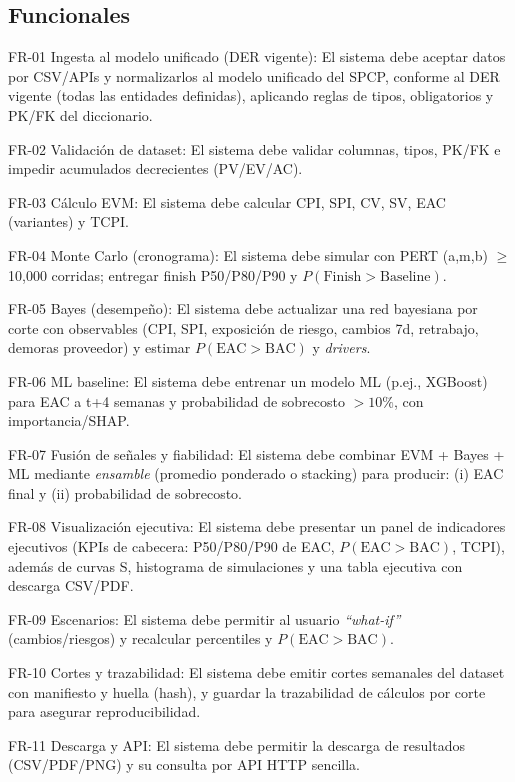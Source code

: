 \documentclass[12pt]
{charter}
\begin{document}
\subsection{Funcionales}
\begin{description}
  \item FR-01 Ingesta al modelo unificado (DER vigente): El sistema debe aceptar datos por CSV/APIs y normalizarlos al modelo unificado del SPCP, conforme al DER vigente (todas las entidades definidas), aplicando reglas de tipos, obligatorios y PK/FK del diccionario.

  \item FR-02 Validación de dataset: El sistema debe validar columnas, tipos, PK/FK e impedir acumulados decrecientes (PV/EV/AC).

  \item FR-03 Cálculo EVM: El sistema debe calcular CPI, SPI, CV, SV, EAC (variantes) y TCPI.

  \item FR-04 Monte Carlo (cronograma): El sistema debe simular con PERT (a,m,b) $\geq$ 10{,}000 corridas; entregar finish P50/P80/P90 y $P(\text{Finish}>\text{Baseline})$.

  \item FR-05 Bayes (desempeño): El sistema debe actualizar una red bayesiana por corte con observables (CPI, SPI, exposición de riesgo, cambios 7d, retrabajo, demoras proveedor) y estimar $P(\text{EAC}>\text{BAC})$ y \textit{drivers}.

  \item FR-06 ML baseline: El sistema debe entrenar un modelo ML (p.ej., XGBoost) para EAC a t+4 semanas y probabilidad de sobrecosto $>10\%$, con importancia/SHAP.

  \item FR-07 Fusión de señales y fiabilidad: El sistema debe combinar EVM + Bayes + ML mediante \textit{ensamble} (promedio ponderado o stacking) para producir: (i) EAC final y (ii) probabilidad de sobrecosto. 

  \item FR-08 Visualización ejecutiva: El sistema debe presentar un panel de indicadores ejecutivos (KPIs de cabecera: P50/P80/P90 de EAC, $P(\text{EAC}>\text{BAC})$, TCPI), además de curvas S, histograma de simulaciones y una tabla ejecutiva con descarga CSV/PDF.

  \item FR-09 Escenarios: El sistema debe permitir al usuario \textit{“what-if”} (cambios/riesgos) y recalcular percentiles y $P(\text{EAC}>\text{BAC})$.

  \item FR-10 Cortes y trazabilidad: El sistema debe emitir cortes semanales del dataset con manifiesto y huella (hash), y guardar la trazabilidad de cálculos por corte para asegurar reproducibilidad.

  \item FR-11 Descarga y API: El sistema debe permitir la descarga de resultados (CSV/PDF/PNG) y su consulta por API HTTP sencilla.

\end{description}
\end{document}
